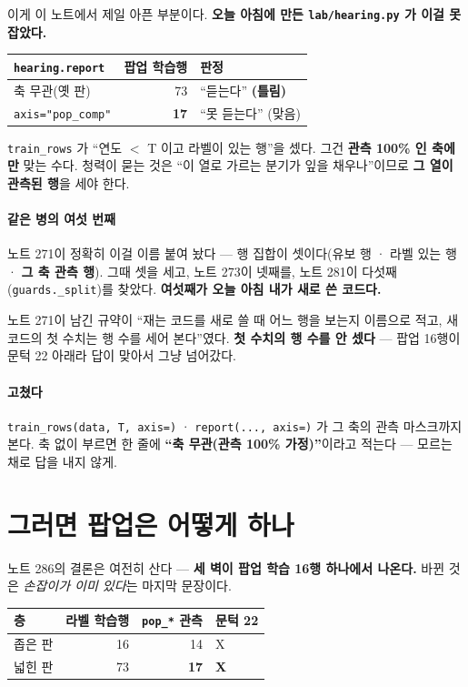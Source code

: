 \documentclass[10pt]{article}
\begin{document}
이게 이 노트에서 제일 아픈 부분이다. \textbf{오늘 아침에 만든
\texttt{lab/hearing.py} 가 이걸 못 잡았다.}

\begin{center}\small
\begin{tabular}{lrl}
\hline
\texttt{hearing.report} & 팝업 학습행 & 판정 \\
\hline
축 무관(옛 판) & 73 & ``듣는다'' \textbf{(틀림)} \\
\texttt{axis="pop\_comp"} & \textbf{17} & ``못 듣는다'' (맞음) \\
\hline
\end{tabular}
\end{center}

\texttt{train\_rows} 가 ``연도 $<$ T 이고 라벨이 있는 행''을 셌다. 그건
\textbf{관측 100\% 인 축에만} 맞는 수다. 청력이 묻는 것은 ``이 열로 가르는
분기가 잎을 채우나''이므로 \textbf{그 열이 관측된 행}을 세야 한다.

\paragraph{같은 병의 여섯 번째} 노트 271이 정확히 이걸 이름 붙여 놨다 ---
행 집합이 셋이다(유보 행 · 라벨 있는 행 · \textbf{그 축 관측 행}). 그때
셋을 세고, 노트 273이 넷째를, 노트 281이 다섯째(\texttt{guards.\_split})를
찾았다. \textbf{여섯째가 오늘 아침 내가 새로 쓴 코드다.}

노트 271이 남긴 규약이 ``재는 코드를 새로 쓸 때 어느 행을 보는지 이름으로
적고, 새 코드의 첫 수치는 행 수를 세어 본다''였다. \textbf{첫 수치의 행
수를 안 셌다} --- 팝업 16행이 문턱 22 아래라 답이 맞아서 그냥 넘어갔다.

\paragraph{고쳤다} \texttt{train\_rows(data, T, axis=)} · \texttt{report(...,
axis=)} 가 그 축의 관측 마스크까지 본다. 축 없이 부르면 한 줄에 \textbf{``축
무관(관측 100\% 가정)''}이라고 적는다 --- 모르는 채로 답을 내지 않게.

\section{그러면 팝업은 어떻게 하나}

노트 286의 결론은 여전히 산다 --- \textbf{세 벽이 팝업 학습 16행 하나에서
나온다.} 바뀐 것은 \emph{손잡이가 이미 있다}는 마지막 문장이다.

\begin{center}\small
\begin{tabular}{lrrl}
\hline
층 & 라벨 학습행 & \texttt{pop\_*} 관측 & 문턱 22 \\
\hline
좁은 판 & 16 & 14 & X \\
넓힌 판 & 73 & \textbf{17} & \textbf{X} \\
\hline
\end{tabular}
\end{center}
\end{document}
